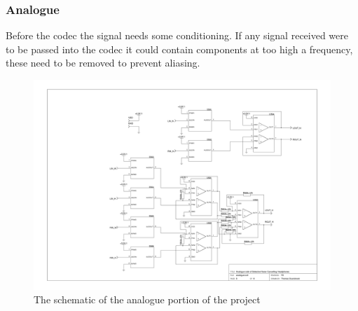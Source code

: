 \subsubsection{Analogue}
Before the codec the signal needs some conditioning.
If any signal received were to be passed into the codec it could contain components at too high a frequency, these need to be removed to prevent aliasing.

\begin{figure}[H]
	\centering
	\includegraphics[width=\textwidth]{./img/analogue.png}
	\caption{The schematic of the analogue portion of the project}
	\label{fig:analoguesch}
\end{figure}

